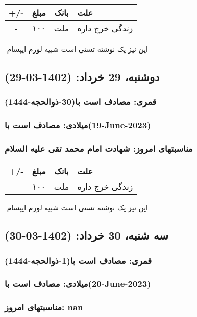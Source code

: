\documentclass{article}
\newcommand{\rnote}[1]{\marginpar{\textcolor{color}{\StrSubstitute{\##1}{ }{\_}}}}
\newcommand{\myRow}[4]{
    #1 & #2 & #3 & #4 \\ \hline
}
\begin{document}
\begin{tabular}{ | c | c | c | p{5cm} |}
    \hline
    \myRow{ +/- }{مبلغ}{بانک}{علت}
    \myRow{-}{۱۰۰}{ملت}{زندگی خرج داره}
\end{tabular}
\newline
\newline

‌
\rnote{تست}
این نیز یک نوشته تستی است شبیه لورم ایپسام




\newpage
{}
\textcolor{color}{
\section{ دوشنبه، 29 خرداد: (1402-03-29) }
\subsubsection*{قمری: مصادف است با(30-ذوالحجه-1444)} 
\subsubsection*{میلادی: مصادف است با(19-June-2023)}
\subsubsection*{مناسبتهای امروز: شهادت امام محمد تقی علیه السلام}
}


\begin{tabular}{ | c | c | c | p{5cm} |}
    \hline
    \myRow{ +/- }{مبلغ}{بانک}{علت}
    \myRow{-}{۱۰۰}{ملت}{زندگی خرج داره}
\end{tabular}
\newline
\newline

‌
\rnote{تست}
این نیز یک نوشته تستی است شبیه لورم ایپسام




\newpage
{}
\textcolor{color}{
\section{ سه شنبه، 30 خرداد: (1402-03-30) }
\subsubsection*{قمری: مصادف است با(1-ذوالحجه-1444)} 
\subsubsection*{میلادی: مصادف است با(20-June-2023)}
\subsubsection*{مناسبتهای امروز: nan}
}
\end{document}
